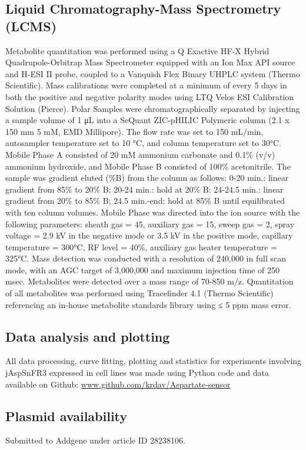 \documentclass[9pt,lineno]{elife}
\begin{document}
\subsection{Liquid Chromatography-Mass Spectrometry (LCMS)}
Metabolite quantitation was performed using a Q Exactive HF-X Hybrid Quadrupole-Orbitrap Mass Spectrometer equipped with an Ion Max API source and H-ESI II probe, coupled to a Vanquish Flex Binary UHPLC system (Thermo Scientific).
Mass calibrations were completed at a minimum of every 5 days in both the positive and negative polarity modes using LTQ Velos ESI Calibration Solution (Pierce).
Polar Samples were chromatographically separated by injecting a sample volume of 1 μL into a SeQuant ZIC-pHILIC Polymeric column (2.1 x 150 mm 5 mM, EMD Millipore).
The flow rate was set to 150 mL/min, autosampler temperature set to 10 °C, and column temperature set to 30°C.
Mobile Phase A consisted of 20 mM ammonium carbonate and 0.1\% (v/v) ammonium hydroxide, and Mobile Phase B consisted of 100\% acetonitrile.
The sample was gradient eluted (\%B) from the column as follows: 0-20 min.: linear gradient from 85\% to 20\% B; 20-24 min.: hold at 20\% B; 24-24.5 min.: linear gradient from 20\% to 85\% B; 24.5 min.-end: hold at 85\% B until equilibrated with ten column volumes.
Mobile Phase was directed into the ion source with the following parameters: sheath gas = 45, auxiliary gas = 15, sweep gas = 2, spray voltage = 2.9 kV in the negative mode or 3.5 kV in the positive mode, capillary temperature = 300°C, RF level = 40\%, auxiliary gas heater temperature = 325°C.
Mass detection was conducted with a resolution of 240,000 in full scan mode, with an AGC target of 3,000,000 and maximum injection time of 250 msec.
Metabolites were detected over a mass range of 70-850 m/z.
Quantitation of all metabolites was performed using Tracefinder 4.1 (Thermo Scientific) referencing an in-house metabolite standards library using ≤ 5 ppm mass error.

\subsection{Data analysis and plotting}
All data processing, curve fitting, plotting and statistics for experiments involving jAspSnFR3 expressed in cell lines was made using Python code and data available on Github:
\url{www.github.com/krdav/Aspartate-sensor}

\subsection{Plasmid availability}
Submitted to Addgene under article ID 28238106.
\end{document}
